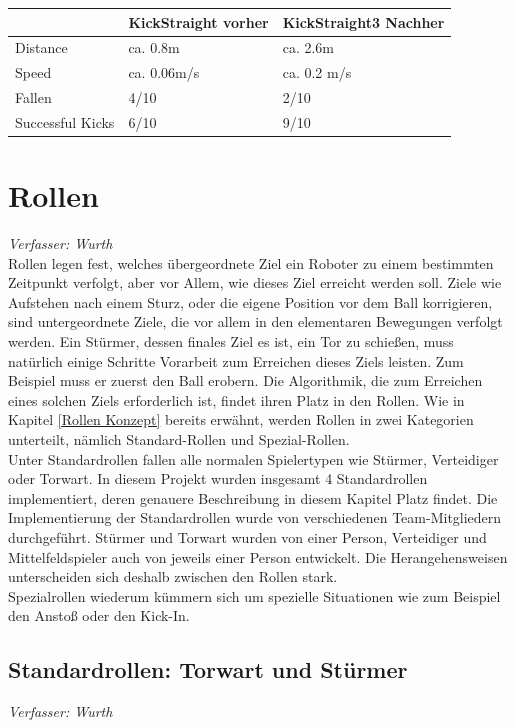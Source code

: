 \documentclass[fontsize=12pt,a4paper,final]{scrartcl}[2003/01/01]
\begin{document}
\begin{tabularx}{\textwidth}{|X|X|X|}
\hline
 & \textbf{KickStraight vorher} & \textbf{KickStraight3 Nachher}\\
\hline
\hline
 Distance & ca. 0.8m & ca. 2.6m\\
\hline 
 Speed & ca. 0.06m/s & ca. 0.2 m/s\\
\hline
 Fallen & 4/10 & 2/10\\
\hline
 Successful Kicks & 6/10 & 9/10\\
\hline
\end{tabularx}

\section{Rollen}
\textit{Verfasser: Wurth}\\

Rollen legen fest, welches übergeordnete Ziel ein Roboter zu einem bestimmten Zeitpunkt verfolgt, aber vor Allem, wie dieses Ziel erreicht werden soll. Ziele wie Aufstehen nach einem Sturz, oder die eigene Position vor dem Ball korrigieren, sind untergeordnete Ziele, die vor allem in den elementaren Bewegungen verfolgt werden. Ein Stürmer, dessen finales Ziel es ist, ein Tor zu schießen, muss natürlich einige Schritte Vorarbeit zum Erreichen dieses Ziels leisten. Zum Beispiel muss er zuerst den Ball erobern. Die Algorithmik, die zum Erreichen eines solchen Ziels erforderlich ist, findet ihren Platz in den Rollen. Wie in Kapitel \ref{Rollen Konzept} bereits erwähnt, werden Rollen in zwei Kategorien unterteilt, nämlich Standard-Rollen und Spezial-Rollen.
\\

Unter Standardrollen fallen alle normalen Spielertypen wie Stürmer, Verteidiger oder Torwart. In diesem Projekt wurden insgesamt 4 Standardrollen implementiert, deren genauere Beschreibung in diesem Kapitel Platz findet. Die Implementierung der Standardrollen wurde von verschiedenen Team-Mitgliedern durchgeführt. Stürmer und Torwart wurden von einer Person, Verteidiger und Mittelfeldspieler auch von jeweils einer Person entwickelt. Die Herangehensweisen unterscheiden sich deshalb zwischen den Rollen stark.
\\

Spezialrollen wiederum kümmern sich um spezielle Situationen wie zum Beispiel den Anstoß oder den Kick-In.


\subsection{Standardrollen: Torwart und Stürmer}
\textit{Verfasser: Wurth}\\
\end{document}
